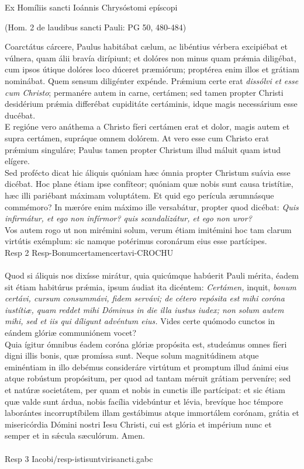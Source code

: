 \documentclass[options]{article}
\begin{document}
	Ex Homíliis sancti Ioánnis Chrysóstomi epíscopi 
	\begin{flushright}
		(Hom. 2 de laudibus sancti Pauli: PG 50, 480-484)
	\end{flushright}	
	Coarctátus cárcere, Paulus habitábat cælum, ac libéntius vérbera excipiébat et vúlnera, quam álii bravía dirípiunt; et dolóres non minus quam pr\'{æ}mia diligébat, cum ipsos útique dolóres loco dúceret præmiórum; proptérea enim illos et grátiam nominábat. Quem sensum diligénter expénde. Pr\'{æ}mium certe erat \emph{dissólvi et esse cum Christo}; permanére autem in carne, certámen; sed tamen propter Christi desidérium pr\'{æ}mia differébat cupiditáte certáminis, idque magis necessárium esse ducébat.\\
	E regióne vero anáthema a Christo fíeri certámen erat et dolor, magis autem et supra certámen, supráque omnem dolórem. At vero esse cum Christo erat pr\'{æ}mium singuláre; Paulus tamen propter Christum illud máluit quam istud elígere.\\
	Sed profécto dicat hic áliquis quóniam hæc ómnia propter Christum suávia esse dicébat. Hoc plane étiam ipse confíteor; quóniam quæ nobis sunt causa tristítiæ, hæc illi pariébant máximam voluptátem. Et quid ego perícula ærumnásque commémoro? In mæróre enim máximo ille versabátur, propter quod dicébat: \emph{Quis infirmátur, et ego non infírmor? quis scandalizátur, et ego non uror?}\\
	Vos autem rogo ut non mirémini solum, verum étiam imitémini hoc tam clarum virtútis exémplum: sic namque potérimus coronárum eius esse partícipes.\\
	
	Resp 2  Resp-Bonumcertamencertavi-CROCHU\\
	\\	
	Quod si áliquis nos dixísse mirátur, quia quicúmque habúerit Pauli mérita, éadem sit étiam habitúrus pr\'{æ}mia, ipsum áudiat ita dicéntem: \emph{Certámen,} inquit, \emph{bonum certávi, cursum consummávi, fidem servávi; de cétero repósita est mihi coróna iustítiæ, quam reddet mihi Dóminus in die illa iustus iudex; non solum autem mihi, sed et iis qui díligunt advéntum eius.} Vides certe quómodo cunctos in eándem glóriæ communiónem vocet?\\
	Quia ígitur ómnibus éadem coróna glóriæ propósita est, studeámus omnes fíeri digni illis bonis, quæ promíssa sunt.
	Neque solum magnitúdinem atque eminéntiam in illo debémus consideráre virtútum et promptum illud ánimi eius atque robústum propósitum, per quod ad tantam méruit grátiam perveníre; sed et natúræ societátem, per quam et nobis in cunctis ille partícipat: et sic étiam quæ valde sunt árdua, nobis facília videbúntur et lévia, brevíque hoc témpore laborántes incorruptíbilem illam gestábimus atque immortálem corónam, grátia et misericórdia Dómini nostri Iesu Christi, cui est glória et impérium nunc et semper et in s\'{æ}cula sæculórum. Amen.\\
	\\
	Resp 3 Iacobi/resp-istisuntvirisancti.gabc
\end{document}
